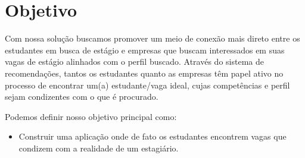 \section{Objetivo}
Com nossa solução buscamos promover um meio de conexão mais direto entre os estudantes em busca de estágio e empresas que buscam interessados em suas vagas de estágio alinhados com o perfil buscado. Através do sistema de recomendações, tantos os estudantes quanto as empresas têm papel ativo no processo de encontrar um(a) estudante/vaga ideal, cujas competências e perfil sejam condizentes com o que é procurado.

Podemos definir nosso objetivo principal como:
\begin{itemize}
		\item Construir uma aplicação onde de fato os estudantes encontrem vagas que condizem com a realidade de um estagiário.
\end{itemize}


